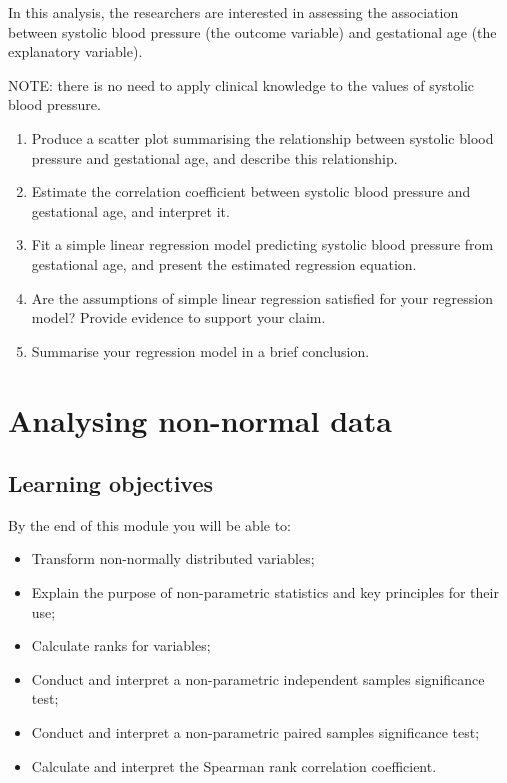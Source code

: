 \documentclass[
  a4paper,
]{memoir}
\providecommand{\tightlist}{%
  \setlength{\itemsep}{0pt}\setlength{\parskip}{0pt}}
\begin{document}
In this analysis, the researchers are interested in assessing the
association between systolic blood pressure (the outcome variable) and
gestational age (the explanatory variable).

NOTE: there is no need to apply clinical knowledge to the values of
systolic blood pressure.

\begin{enumerate}
\def\labelenumi{\alph{enumi})}
\tightlist
\item
  Produce a scatter plot summarising the relationship between systolic
  blood pressure and gestational age, and describe this relationship.
\item
  Estimate the correlation coefficient between systolic blood pressure
  and gestational age, and interpret it.
\item
  Fit a simple linear regression model predicting systolic blood
  pressure from gestational age, and present the estimated regression
  equation.
\item
  Are the assumptions of simple linear regression satisfied for your
  regression model? Provide evidence to support your claim.
\item
  Summarise your regression model in a brief conclusion.
\end{enumerate}


\chapter{Analysing non-normal data}\label{analysing-non-normal-data}

\section*{Learning objectives}\label{learning-objectives-8}


By the end of this module you will be able to:

\begin{itemize}
\tightlist
\item
  Transform non-normally distributed variables;
\item
  Explain the purpose of non-parametric statistics and key principles
  for their use;
\item
  Calculate ranks for variables;
\item
  Conduct and interpret a non-parametric independent samples
  significance test;
\item
  Conduct and interpret a non-parametric paired samples significance
  test;
\item
  Calculate and interpret the Spearman rank correlation coefficient.
\end{itemize}
\end{document}

